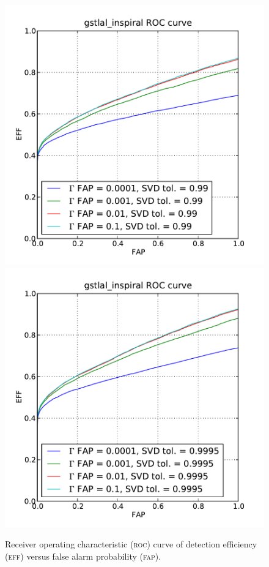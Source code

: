 \begin{figure}[htbp]
\begin{center}
\includegraphics[scale=0.4]{figures/roc_99.pdf}
\includegraphics[scale=0.4]{figures/roc_9995.pdf}
\caption{Receiver operating characteristic (\textsc{roc}) curve of detection efficiency (\textsc{eff}) versus false alarm probability (\textsc{fap}).}
\label{fig:roc}
\end{center}
\end{figure}
